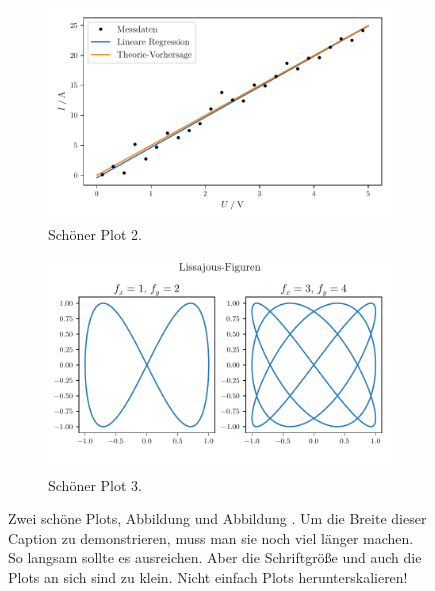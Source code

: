 \documentclass{scrartcl}
\begin{document}
\begin{figure}%
  \begin{subfigure}{0.475\textwidth}%
    \includegraphics[width=\textwidth]{plot2.pdf}%
    \caption{Schöner Plot 2.}%
    \label{fig:plot2}%
  \end{subfigure}%
  \hfill%
  \begin{subfigure}{0.475\textwidth}%
    \centering%
    \includegraphics[width=\textwidth]{plot3.pdf}%
    \caption{Schöner Plot 3.}%
    \label{fig:plot3}%
  \end{subfigure}%
  \caption{%
    Zwei schöne Plots, Abbildung  und Abbildung .
    Um die Breite dieser Caption zu demonstrieren, muss man sie noch viel länger machen.
    So langsam sollte es ausreichen.
    Aber die Schriftgröße und auch die Plots an sich sind zu klein.
    Nicht einfach Plots herunterskalieren!
  }\label{fig:subfigs}%
\end{figure}
\end{document}
